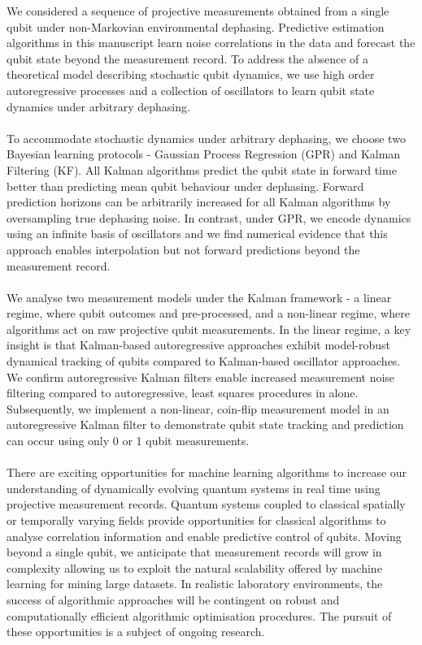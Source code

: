 We considered a sequence of projective measurements obtained from a single qubit under non-Markovian environmental dephasing. Predictive estimation algorithms in this manuscript learn noise correlations in the data and forecast the qubit state beyond the measurement record. To address the absence of a theoretical model describing stochastic qubit dynamics, we use high order autoregressive processes and a collection of oscillators to learn qubit state dynamics under arbitrary dephasing. 
\\
\\
To accommodate stochastic dynamics under arbitrary dephasing, we choose two Bayesian learning protocols - Gaussian Process Regression (GPR) and Kalman Filtering (KF).  All Kalman algorithms predict the qubit state in forward time better than predicting mean qubit behaviour under dephasing.  Forward prediction horizons can be arbitrarily increased for all Kalman algorithms by oversampling true dephasing noise.  In contrast, under GPR, we encode dynamics using an infinite basis of oscillators and we find numerical evidence that this approach enables interpolation but not forward predictions beyond the measurement record.  
\\
\\
We analyse two measurement models under the Kalman framework - a linear regime, where qubit outcomes and pre-processed, and a non-linear regime, where algorithms act on raw projective qubit measurements. In the linear regime, a key insight is that Kalman-based autoregressive approaches exhibit model-robust dynamical tracking of qubits compared to Kalman-based oscillator approaches. We confirm autoregressive Kalman filters enable increased measurement noise filtering compared to autoregressive, least squares procedures in \cite{mavadia2017} alone. Subsequently, we implement a non-linear, coin-flip measurement model in an autoregressive Kalman filter to demonstrate qubit state tracking and prediction can occur using only 0 or 1 qubit measurements. 
\\
\\
There are exciting opportunities for machine learning algorithms to increase our understanding of dynamically evolving quantum systems in real time using  projective measurement records. Quantum systems coupled to classical spatially or temporally varying fields provide opportunities for classical algorithms to analyse correlation information and enable predictive control of qubits. Moving beyond a single qubit, we anticipate that measurement records will grow in complexity allowing us to exploit the natural scalability offered by machine learning for mining large datasets. In realistic laboratory environments, the success of algorithmic approaches will be contingent on robust and computationally efficient algorithmic optimisation procedures. The pursuit of these opportunities is a subject of ongoing research.

